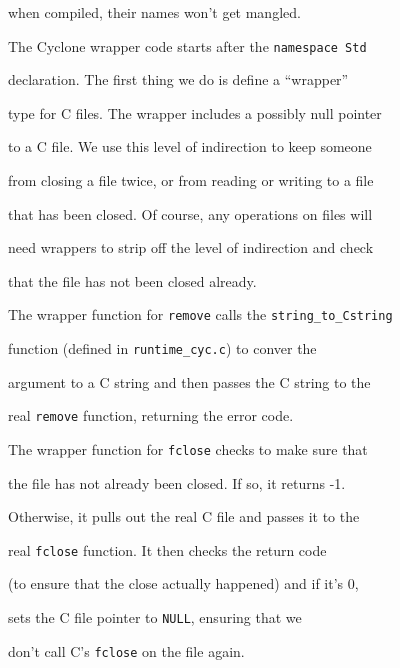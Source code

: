 when compiled, their names won't get mangled.





The Cyclone wrapper code starts after the \texttt{namespace Std}


declaration.  The first thing we do is define a ``wrapper''


type for C files.  The wrapper includes a possibly null pointer


to a C file.  We use this level of indirection to keep someone


from closing a file twice, or from reading or writing to a file


that has been closed.  Of course, any operations on files will


need wrappers to strip off the level of indirection and check


that the file has not been closed already.  





The wrapper function for \texttt{remove} calls the \texttt{string\_to\_Cstring}


function (defined in \texttt{runtime\_cyc.c}) to conver the


argument to a C string and then passes the C string to the


real \texttt{remove} function, returning the error code.





The wrapper function for \texttt{fclose} checks to make sure that


the file has not already been closed.  If so, it returns -1.


Otherwise, it pulls out the real C file and passes it to the


real \texttt{fclose} function.  It then checks the return code


(to ensure that the close actually happened) and if it's 0,


sets the C file pointer to \texttt{NULL}, ensuring that we


don't call C's \texttt{fclose} on the file again.  






